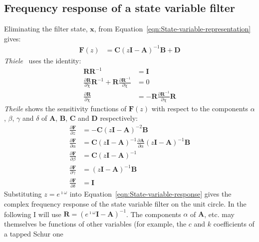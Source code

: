 \documentclass[a4paper,twoside,10pt,english]{article}
\begin{document}
\subsection{\label{sec:Frequency-response-of-state-variable-filter}Frequency response of a state variable filter}
Eliminating the filter state, $\mathbf{x}$, from
Equation~\ref{eqn:State-variable-representation} gives:
\begin{align}
\mathbf{F}\left(z\right) &= 
    \mathbf{C}\left(z\mathbf{I}-\mathbf{A}\right)^{-1}\mathbf{B}+\mathbf{D}
\label{eqn:State-variable-response}
\end{align}
\emph{Thiele}~\cite{Theile_SensitivityLinearStateSpaceSystems} uses the identity:
\begin{align*}
  \mathbf{R}\mathbf{R}^{-1} &= \mathbf{I} \\
\frac{\partial\mathbf{R}}{\partial\chi}\mathbf{R}^{-1} 
  +\mathbf{R}\frac{\partial\mathbf{R}^{-1}}{\partial\chi} &= 0 \\
  \frac{\partial\mathbf{R}}{\partial\chi} 
    &=-\mathbf{R}\frac{\partial\mathbf{R}^{-1}}{\partial\chi}\mathbf{R}
\end{align*}
\emph{Theile} shows the sensitivity functions of $\mathbf{F}\left(z\right)$ with
respect to the components $\alpha$, $\beta$, $\gamma$ and $\delta$ of
$\mathbf{A}$, $\mathbf{B}$, $\mathbf{C}$ and $\mathbf{D}$ respectively:
\begin{align*}
\frac{\partial\mathbf{F}}{\partial{}z} &= 
-\mathbf{C}\left(z\mathbf{I}-\mathbf{A}\right)^{-2}\mathbf{B} \\
  \frac{\partial\mathbf{F}}{\partial\alpha} &= 
\mathbf{C}\left(z\mathbf{I}-\mathbf{A}\right)^{-1}\frac{\partial\mathbf{A}}{\partial\alpha}
\left(z\mathbf{I}-\mathbf{A}\right)^{-1}\mathbf{B} \\
\frac{\partial\mathbf{F}}{\partial\beta} &= 
\mathbf{C}\left(z\mathbf{I}-\mathbf{A}\right)^{-1}\\
\frac{\partial\mathbf{F}}{\partial\gamma} &= 
\left(z\mathbf{I}-\mathbf{A}\right)^{-1}\mathbf{B}\\
\frac{\partial\mathbf{F}}{\partial\delta} &= \mathbf{I}
\end{align*}
Substituting $z=e^{\imath\omega}$ into Equation~\ref{eqn:State-variable-response}
gives the complex frequency response of the state variable filter on the unit
circle. In the following I will use
$\mathbf{R}=\left(e^{\imath\omega}\mathbf{I}-\mathbf{A}\right)^{-1}$. The
components $\alpha$ of $\mathbf{A}$, etc. may themselves be functions of other
variables (for example, the $c$ and $k$ coefficients of a tapped Schur one
\end{document}
